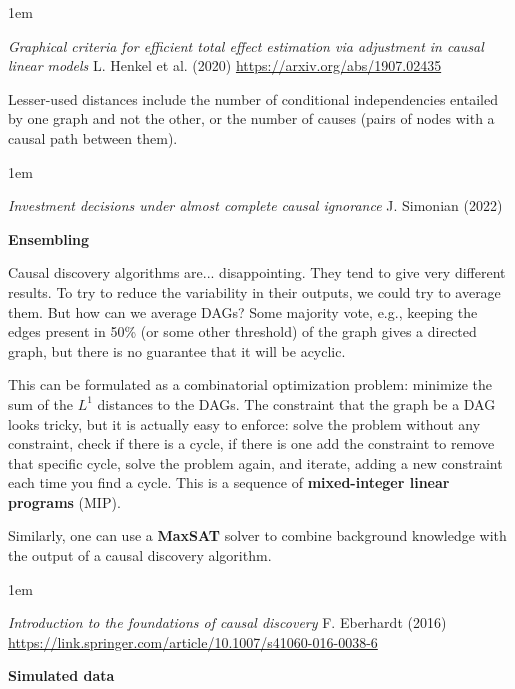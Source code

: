 \documentclass[a5paper]{article}
\let\d\textbf
\newenvironment{reference}{%
  \medskip\goodbreak
  \parskip 0pt
  \raggedright
  \leftskip 1em
  \obeylines
}{\par\medskip\goodbreak}
\def\subsection#1{{\par\bigskip\goodbreak\large\bfseries #1\par}}
\begin{document}
\begin{reference}
  \emph{Graphical criteria for efficient total effect estimation via adjustment in causal linear models}
  L. Henkel et al. (2020)
  \url{https://arxiv.org/abs/1907.02435}
\end{reference}

Lesser-used distances include
the number of conditional independencies entailed by one graph and not the other,
or the number of causes (pairs of nodes with a causal path between them).

\begin{reference}
  \emph{Investment decisions under almost complete causal ignorance}
  J. Simonian (2022)
\end{reference}
  
\subsection{Ensembling}

Causal discovery algorithms are... disappointing.
They tend to give very different results.
To try to reduce the variability in their outputs,
we could try to average them.
But how can we average DAGs?
Some majority vote, e.g., keeping the edges present in 50\% (or some other threshold) of the graph
gives a directed graph, but there is no guarantee that it will be acyclic.

This can be formulated as a combinatorial optimization problem:
minimize the sum of the $L^1$ distances to the DAGs.
The constraint that the graph be a DAG looks tricky, but it is actually easy to enforce:
solve the problem without any constraint, check if there is a cycle,
if there is one add the constraint to remove that specific cycle, solve the problem again, and iterate,
adding a new constraint each time you find a cycle.
This is a sequence of \d{mixed-integer linear programs} (MIP).

Similarly, one can use a \d{MaxSAT} solver to combine
background knowledge with the output of a causal discovery algorithm.

\begin{reference}
  \emph{Introduction to the foundations of causal discovery}
  F. Eberhardt (2016)
  \url{https://link.springer.com/article/10.1007/s41060-016-0038-6}
\end{reference}

\subsection{Simulated data}
\end{document}
